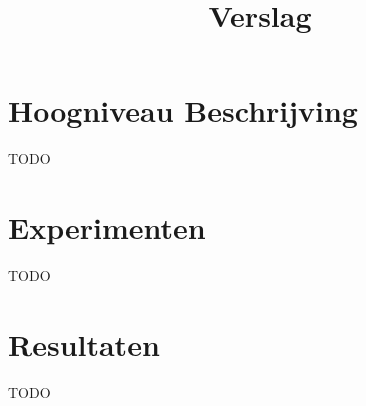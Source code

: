 \documentclass[10pt,a4paper]{article}
\title{Verslag}
\begin{document}


\section{Hoogniveau Beschrijving}
TODO

\section{Experimenten}
TODO

\section{Resultaten}
TODO
\end{document}
